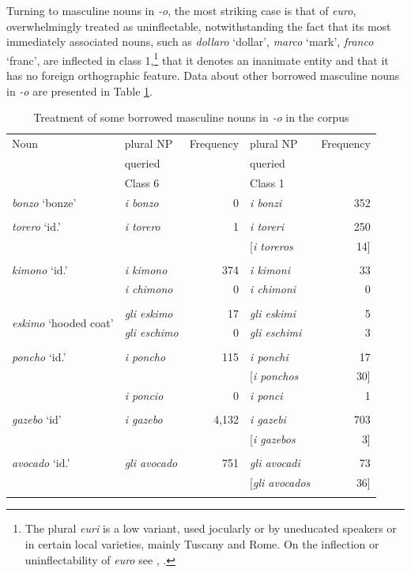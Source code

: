 \documentclass[output=paper,colorlinks,citecolor=brown]{langscibook}
\begin{document}
Turning to masculine nouns in \emph{-o}, the most striking case is that of \emph{euro}, overwhelmingly treated as uninflectable, notwithstanding the fact that its most immediately associated nouns, such as \emph{dollaro} `dollar', \emph{marco} `mark', \emph{franco} `franc', are inflected in class 1,\footnote{The plural \emph{euri} is a low variant, used jocularly or by uneducated speakers or in certain local varieties, mainly Tuscany and Rome. On the inflection or uninflectability of \emph{euro} see \citet{fanfani2001}, \citet{gomezgane2003}.} that it denotes an inanimate entity and that it has no foreign orthographic feature. Data about other borrowed masculine nouns in \emph{-o} are presented in Table \ref{10tab15}.

\begin{table}[ht]
	\centering
	\begin{tabularx}{\textwidth}{lXrXr}
		\lsptoprule
		Noun & plural NP & Frequency & plural NP & Frequency \\
		& queried & & queried & \\
		& Class 6\is{inflectional class} & & Class 1 & \\
		\midrule
		\emph{bonzo} ‘bonze’ & \emph{i bonzo} & 0 & \emph{i bonzi} & 352 \\
		& & & & \\
		\emph{torero} ‘id.’ & \emph{i torero} & 1 & \emph{i toreri} & 250 \\
		& & & [\emph{i toreros} & 14] \\
		& & & & \\
		\emph{kimono} ‘id.’ & \emph{i kimono} & 374 & \emph{i kimoni} & 33 \\
		& \emph{i chimono} & 0 & \emph{i chimoni} & 0 \\
		& & & & \\
		\multirow{2}{2.5cm}{\emph{eskimo} ‘hooded coat’} & \emph{gli eskimo} & 17 & \emph{gli eskimi} & 5 \\
		& \emph{gli eschimo} & 0 & \emph{gli eschimi} & 3 \\
		& & & & \\
		\emph{poncho} ‘id.’ & \emph{i poncho} & 115 & \emph{i ponchi} & 17 \\
		& & & [\emph{i ponchos} & 30] \\
		& \emph{i poncio} & 0 & \emph{i ponci} & 1 \\
		& & & & \\
		\emph{gazebo} ‘id’ & \emph{i gazebo} & 4,132 & \emph{i gazebi} & 703 \\
		& & & [\emph{i gazebos} & 3] \\
		& & & & \\
		\emph{avocado} ‘id.’ & \emph{gli avocado} & 751 & \emph{gli avocadi} & 73 \\
		& & & [\emph{gli avocados} & 36] \\
		\lspbottomrule
	\end{tabularx}
	\caption{Treatment of some borrowed masculine nouns in \emph{‑o} in the  corpus}
	\label{10tab15}
\end{table}
\end{document}
